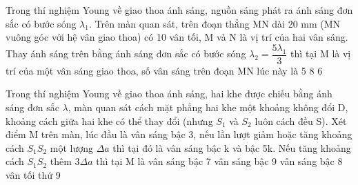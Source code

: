 \begin{vidu}%
Trong thí nghiệm Young về giao thoa ánh sáng, nguồn sáng phát ra ánh sáng đơn sắc có bước sóng ${{\lambda}_{1}} $. Trên màn quan sát, trên đoạn thẳng MN dài 20 mm (MN vuông góc với hệ vân giao thoa) có 10 vân tối, M và N là vị trí của hai vân sáng. Thay ánh sáng trên bằng ánh sáng đơn sắc có bước sóng ${{\lambda}_{2}}=\dfrac{5{{\lambda}_{1}}}{3} $ thì tại M là vị trí của một vân sáng giao thoa, số vân sáng trên đoạn MN lúc này là
\choice
{}
{5}
{8}
{6}
\end{vidu} 
\begin{vidu}%
Trong thí nghiệm Young về giao thoa ánh sáng, hai khe được chiếu bằng ánh sáng đơn sắc $\lambda $, màn quan sát cách mặt phẳng hai khe một khoảng không đổi D, khoảng cách giữa hai khe có thể thay đổi (nhưng ${S_1} $ và ${S_2} $ luôn cách đều S). Xét điểm M trên màn, lúc đầu là vân sáng bậc 3, nếu lần lượt giảm hoặc tăng khoảng cách ${S_1}{S_2} $ một lượng $\Delta a $ thì tại đó là vân sáng bậc k và bậc 5k. Nếu tăng khoảng cách ${S_1}{S_2} $ thêm $3\Delta a $ thì tại M là
\choice
{vân sáng bậc 7}
{\True vân sáng bậc 9}
{vân sáng bậc 8}
{vân tối thứ 9}
\end{vidu} 
